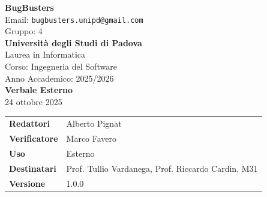 \documentclass[a4paper,12pt]{article}
\newcommand{\CurrentVersion}{1.0.0}
\begin{document}
\begin{center}  
  
  {\Large\bfseries\color{primaryblue} BugBusters}\\[0.3cm]
  {\small\color{darkgray} Email: \texttt{bugbusters.unipd@gmail.com}} \\[0.1cm]
  {\small\color{darkgray} Gruppo: 4} \\[0.5cm]

  {\large\bfseries Università degli Studi di Padova}\\[0.3cm]
  {\small Laurea in Informatica}\\[0.2cm]
  {\small Corso: Ingegneria del Software}\\[0.2cm]
  {\small Anno Accademico: 2025/2026}\\[0.8cm]

  {\Huge\bfseries\color{primaryblue} Verbale Esterno}\\[0.3cm]
  {\Large\color{secondaryblue} 24 ottobre 2025}\\[0.8cm]
\end{center}

\begin{center}
\begin{tcolorbox}[colback=lightgray,colframe=primaryblue,width=0.85\textwidth,arc=3mm,boxrule=0.5pt]
\begin{tabularx}{\linewidth}{@{}lX@{}}
\textbf{Redattori}   & Alberto Pignat\\
\textbf{Verificatore} & Marco Favero\\
\textbf{Uso}          & Esterno\\
\textbf{Destinatari}  & Prof. Tullio Vardanega, Prof. Riccardo Cardin, M31\\
\textbf{Versione} & \CurrentVersion \\

\end{tabularx}
\end{tcolorbox}
\end{center}
\end{document}
